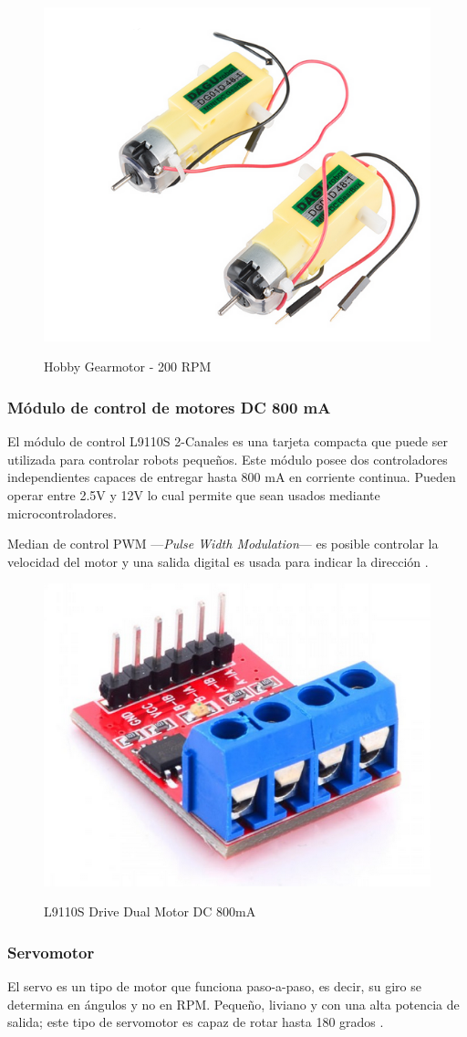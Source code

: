 \begin{figure}[H]
    \centering
    \includegraphics[width = 7 cm]{imagenes/gearmotor.PNG}
    \caption{Hobby Gearmotor - 200 RPM}
    \cite{motor_dc}
\end{figure}

\subsubsection{Módulo de control de motores DC 800 mA}

El módulo de control L9110S 2-Canales es una tarjeta compacta que puede ser utilizada para controlar robots pequeños. Este módulo posee dos controladores independientes capaces de entregar hasta 800 mA en corriente continua. Pueden operar entre 2.5V y 12V lo cual permite que sean usados mediante microcontroladores.

Median de control PWM ---\textit{Pulse Width Modulation}--- es posible controlar la velocidad del motor y una salida digital es usada para indicar la dirección \cite{driver}.

\begin{figure}[H]
    \centering
    \includegraphics[width = 7 cm]{imagenes/driver.PNG}
    \caption{L9110S Drive Dual Motor DC 800mA}
    \cite{driver}
\end{figure}


\subsubsection{Servomotor}
El servo es un tipo de motor que funciona paso-a-paso, es decir, su giro se determina en ángulos y no en RPM. Pequeño, liviano y con una alta potencia de salida; este tipo de servomotor es capaz de rotar hasta 180 grados \cite{servo}.

